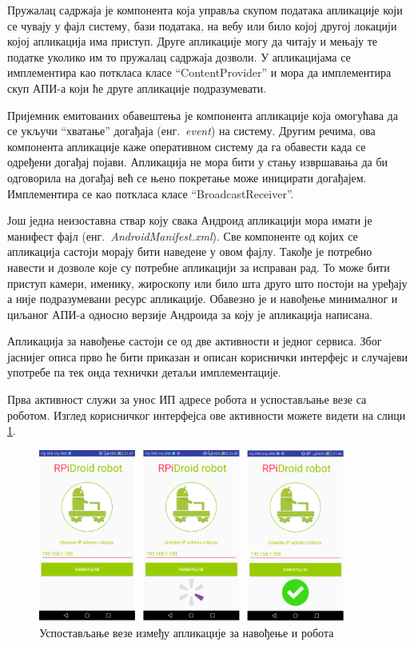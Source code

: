 \documentclass[12pt,oneside]{memoir}
\theoremstyle{remark}
\begin{document}
Пружалац садржаја је компонента која управља скупом података апликације који се чувају у фајл систему, бази података, на вебу или било којој другој локацији којој апликација има приступ. Друге апликације могу да читају и мењају те податке уколико им то пружалац садржаја дозволи. У апликацијама се имплементира као поткласа класе ``ContentProvider'' и мора да имплементира скуп АПИ-а који ће друге апликације подразумевати.

Пријемник емитованих обавештења је компонента апликације која омогућава да се укључи ``хватање'' догађаја (енг.~{\em event}) на систему. Другим речима, ова компонента апликације каже оперативном систему да га обавести када се одређени догађај појави. Апликација не мора бити у стању извршавања да би одговорила на догађај већ се њено покретање може иницирати догађајем. Имплементира се као поткласа класе ``BroadcastReceiver''.

Још једна неизоставна ствар коју свака Андроид апликацији мора имати је манифест фајл  (енг.~{\em AndroidManifest.xml}). Све компоненте од којих се апликација састоји морају бити наведене у овом фајлу. Такође је потребно навести и дозволе које су потребне апликацији за исправан рад. То може бити приступ камери, именику, жироскопу или било шта друго што постоји на уређају а није подразумевани ресурс апликације. Обавезно је и навођење минималног и циљаног АПИ-а односно верзије Андроида за коју је апликација написана. 

Апликација за навођење састоји се од две активности и једног сервиса. Због јаснијег описа прво ће бити приказан и описан кориснички интерфејс и случајеви употребе па тек онда технички детаљи имплементације. 

Прва активност служи за унос ИП адресе робота и успостављање везе са роботом. Изглед корисничког интерфејса ове активности можете видети на слици \ref{fig:activity1}.

\begin{figure}[!ht]
\centering
\includegraphics[width=0.9\textwidth]{slike/povezivanje.png}
\caption{Успостављање везе између апликације за навођење и робота}
\label{fig:activity1}
\end{figure}
\end{document}
